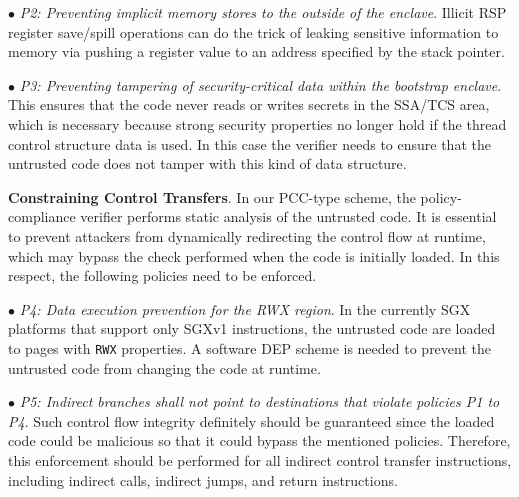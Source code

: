 {\vspace{2pt}\noindent$\bullet$\textit{ P2: Preventing implicit memory stores to the outside of the enclave}. Illicit RSP register save/spill operations can do the trick of leaking sensitive information to memory via pushing a register value to an address specified by the stack pointer. 
    
\vspace{2pt}\noindent$\bullet$\textit{ P3: Preventing tampering of security-critical data within the bootstrap enclave}. This ensures that the code never reads or writes secrets in the SSA/TCS area, which is necessary because strong security properties no longer hold if the thread control structure data is used. In this case the verifier needs to ensure that the untrusted code does not tamper with this kind of data structure.

\vspace{3pt}\noindent\textbf{Constraining Control Transfers}. 
In our PCC-type scheme, the policy-compliance verifier performs static analysis of the untrusted code. It is essential to prevent attackers from dynamically redirecting the control flow at runtime, which may bypass the check performed when the code is initially loaded. In this respect, the following policies need to be enforced. 

\vspace{2pt}\noindent$\bullet$\textit{ P4: Data execution prevention for the RWX region}. In the currently SGX platforms that support only SGXv1 instructions, the untrusted code are loaded to pages with \texttt{RWX} properties. A software DEP scheme is needed to prevent the untrusted code from changing the code at runtime.

\vspace{2pt}\noindent$\bullet$\textit{ P5: Indirect branches shall not point to destinations that violate policies P1 to P4}. Such control flow integrity definitely should be guaranteed since the loaded code could be malicious so that it could bypass the mentioned policies. Therefore, this enforcement should be performed for all indirect control transfer instructions, including indirect calls, indirect jumps, and return instructions.

}
